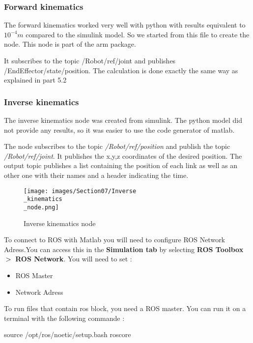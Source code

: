 \subsubsection{Forward kinematics}

The forward kinematics worked very well with python with results equivalent to $10^{-4}m$ compared to the simulink model. So we started from this file to create the node. This node is part of the arm package. 

\bigbreak
It subscribes to the topic /Robot/ref/joint and publishes /EndEffector/state/position. The calculation is done exactly the same way as explained in part 5.2

\subsubsection{Inverse kinematics}

The inverse kinematics node was created from simulink. The python model did not provide any results, so it was easier to use the code generator of matlab.

\bigbreak
The node subscribes to the topic \textit{/Robot/ref/position} and publish the topic \textit{/Robot/ref/joint}. It publishes the x,y,z coordinates of the desired position. The output topic publishes a list containing the position of each link as well as an other one with their names and a header indicating the time.
\bigbreak
\begin{figure}[ht]
    \centering
    \texttt{[image: images/Section07/Inverse\\\_kinematics\\\_node.png]}
    \caption{Inverse kinematics node}
    \label{fig:mesh21}
\end{figure}
\FloatBarrier

\bigbreak
To connect to ROS with Matlab you will need to configure ROS Network Adress.You can access this in the \textbf{Simulation tab} by selecting \textbf{ROS Toolbox} $\bg$ \textbf{ROS Network}. You will need to set :
\begin{multicols}{2}
    \begin{itemize}[noitemsep]
        \item ROS Master
        \item Network Adress
    \end{itemize}
\end{multicols}

\bigbreak
To run files that contain ros block, you need a ROS master. You can run it on a terminal with the following commande :
\begin{commandshell}
    source /opt/ros/noetic/setup.bash
    roscore
\end{commandshell} 

